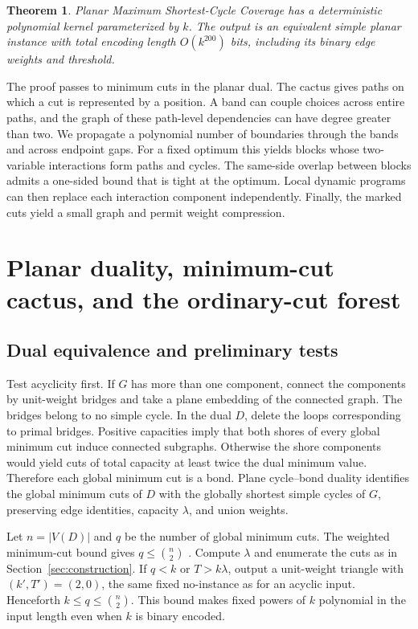 \documentclass[10pt,letterpaper]{article}
\newtheorem{theorem}{Theorem}
\begin{document}
\begin{theorem}\label{thm:main}
Planar Maximum Shortest-Cycle Coverage has a deterministic polynomial kernel parameterized by \(k\). The output is an equivalent simple planar instance with total encoding length \(O(k^{200})\) bits, including its binary edge weights and threshold.
\end{theorem}

The proof passes to minimum cuts in the planar dual. The cactus gives paths on which a cut is represented by a position. A band can couple choices across entire paths, and the graph of these path-level dependencies can have degree greater than two. We propagate a polynomial number of boundaries through the bands and across endpoint gaps. For a fixed optimum this yields blocks whose two-variable interactions form paths and cycles. The same-side overlap between blocks admits a one-sided bound that is tight at the optimum. Local dynamic programs can then replace each interaction component independently. Finally, the marked cuts yield a small graph and permit weight compression.

\section{Planar duality, minimum-cut cactus, and the ordinary-cut forest}
\subsection{Dual equivalence and preliminary tests}
Test acyclicity first. If \(G\) has more than one component, connect the components by unit-weight bridges and take a plane embedding of the connected graph. The bridges belong to no simple cycle. In the dual \(D\), delete the loops corresponding to primal bridges. Positive capacities imply that both shores of every global minimum cut induce connected subgraphs. Otherwise the shore components would yield cuts of total capacity at least twice the dual minimum value. Therefore each global minimum cut is a bond. Plane cycle--bond duality identifies the global minimum cuts of \(D\) with the globally shortest simple cycles of \(G\), preserving edge identities, capacity \(\lambda\), and union weights.

Let \(n=|V(D)|\) and \(q\) be the number of global minimum cuts. The weighted minimum-cut bound gives \(q\le\binom n2\) \cite{KargerStein}. Compute \(\lambda\) and enumerate the cuts as in Section~\ref{sec:construction}. If \(q<k\) or \(T>k\lambda\), output a unit-weight triangle with \((k',T')=(2,0)\), the same fixed no-instance as for an acyclic input. Henceforth \(k\le q\le\binom n2\). This bound makes fixed powers of \(k\) polynomial in the input length even when \(k\) is binary encoded.
\end{document}
